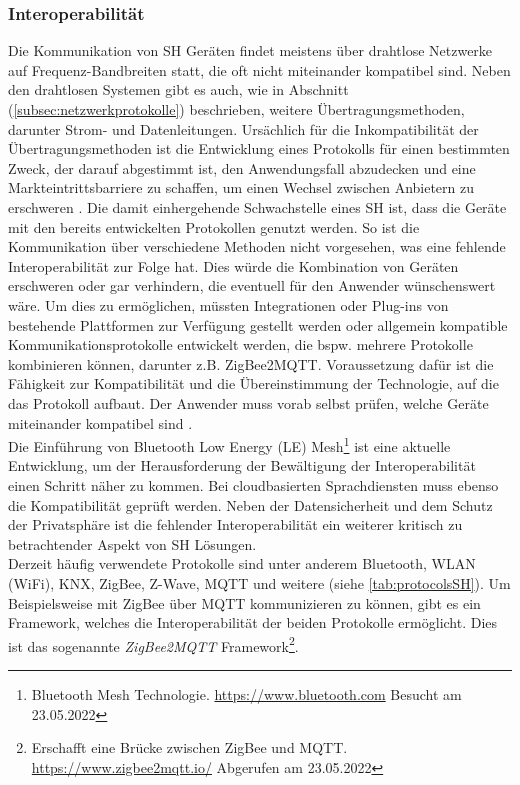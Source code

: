         \subsubsection*{Interoperabilität}
            Die Kommunikation von \acl{SH} Geräten findet meistens über drahtlose Netzwerke auf Frequenz-Bandbreiten statt, die oft nicht 
            miteinander kompatibel sind. Neben den drahtlosen Systemen gibt es auch, wie in Abschnitt (\ref{subsec:netzwerkprotokolle}) beschrieben, 
            weitere Übertragungsmethoden, darunter Strom- und Datenleitungen. Ursächlich für die Inkompatibilität der Übertragungsmethoden 
            ist die Entwicklung eines Protokolls für einen bestimmten 
            Zweck, der darauf abgestimmt ist, den Anwendungsfall abzudecken und eine Markteintrittsbarriere zu 
            schaffen, um einen Wechsel zwischen Anbietern zu erschweren \cite{statista2021}. 
            Die damit einhergehende Schwachstelle eines \acl{SH} ist, dass die Geräte mit den bereits entwickelten 
            Protokollen genutzt werden. So ist die Kommunikation über verschiedene Methoden nicht vorgesehen, was 
            eine fehlende Interoperabilität zur Folge hat. Dies würde die Kombination von Geräten erschweren oder gar verhindern, die eventuell 
            für den Anwender wünschenswert wäre. Um dies zu ermöglichen, müssten Integrationen 
            oder Plug-ins von bestehende Plattformen zur Verfügung gestellt werden oder allgemein kompatible Kommunikationsprotokolle 
            entwickelt werden, die bspw. mehrere Protokolle kombinieren können, darunter z.B. ZigBee2MQTT. 
            Voraussetzung dafür ist die Fähigkeit zur Kompatibilität und die Übereinstimmung der Technologie, auf die das Protokoll aufbaut.
            Der Anwender muss vorab selbst prüfen, welche Geräte miteinander kompatibel sind \cite{statista2021}.
            \\
            \linebreak
            Die Einführung von Bluetooth Low Energy (LE) Mesh\footnote{Bluetooth Mesh Technologie. \url{https://www.bluetooth.com} Besucht am 23.05.2022} 
            ist eine aktuelle Entwicklung, um der Herausforderung der Bewältigung der Interoperabilität einen Schritt näher zu kommen. Bei cloudbasierten 
            Sprachdiensten muss ebenso die Kompatibilität geprüft werden. 
            Neben der Datensicherheit und dem Schutz der Privatsphäre ist die fehlender Interoperabilität ein weiterer kritisch zu betrachtender Aspekt von 
            \acs{SH} Lösungen.
            \\ 
            \linebreak
            Derzeit häufig verwendete Protokolle sind unter anderem Bluetooth, \ac{WLAN} (WiFi), KNX, ZigBee, Z-Wave, 
            MQTT und weitere (siehe \ref{tab:protocolsSH}). Um Beispielsweise mit ZigBee über \acs{MQTT} kommunizieren zu 
            können, gibt es ein Framework, welches die Interoperabilität der beiden Protokolle ermöglicht. Dies ist das 
            sogenannte \textit{ZigBee2MQTT} Framework\footnote{Erschafft eine Brücke zwischen ZigBee und MQTT. \url{https://www.zigbee2mqtt.io/} Abgerufen am 23.05.2022}.
